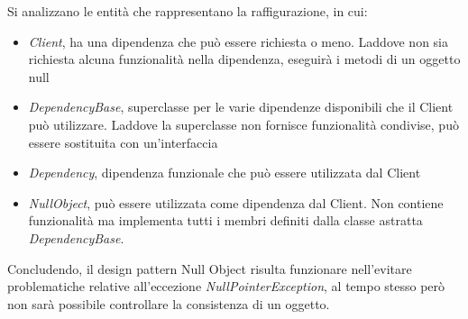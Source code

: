 \documentclass{article}
\begin{document}
Si analizzano le entità che rappresentano la raffigurazione, in cui:
\begin{itemize}[label={-}]
    \itemsep0em
    \item \textit{Client}, ha una dipendenza che può essere richiesta o meno. Laddove non sia richiesta alcuna funzionalità nella dipendenza, eseguirà i metodi di un oggetto null
    \item \textit{DependencyBase}, superclasse per le varie dipendenze disponibili che il Client può utilizzare. Laddove la superclasse non fornisce funzionalità condivise, può essere sostituita con un'interfaccia
    \item \textit{Dependency}, dipendenza funzionale che può essere utilizzata dal Client
    \item \textit{NullObject}, può essere utilizzata come dipendenza dal Client. Non contiene funzionalità ma implementa tutti i membri definiti dalla classe astratta \textit{DependencyBase}.
\end{itemize}
Concludendo, il design pattern Null Object risulta funzionare nell'evitare problematiche relative all'eccezione \textit{NullPointerException}, al tempo stesso però non sarà possibile controllare la consistenza di un oggetto.
\end{document}
